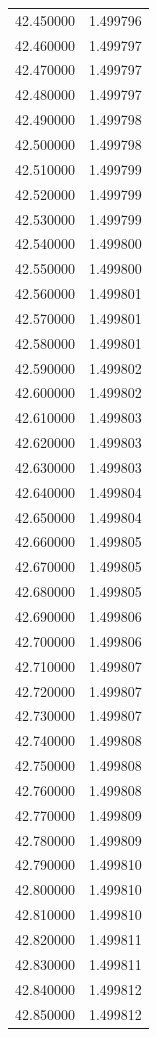 \begin{tabular}{rr}
42.450000 & 1.499796 \\
42.460000 & 1.499797 \\
42.470000 & 1.499797 \\
42.480000 & 1.499797 \\
42.490000 & 1.499798 \\
42.500000 & 1.499798 \\
42.510000 & 1.499799 \\
42.520000 & 1.499799 \\
42.530000 & 1.499799 \\
42.540000 & 1.499800 \\
42.550000 & 1.499800 \\
42.560000 & 1.499801 \\
42.570000 & 1.499801 \\
42.580000 & 1.499801 \\
42.590000 & 1.499802 \\
42.600000 & 1.499802 \\
42.610000 & 1.499803 \\
42.620000 & 1.499803 \\
42.630000 & 1.499803 \\
42.640000 & 1.499804 \\
42.650000 & 1.499804 \\
42.660000 & 1.499805 \\
42.670000 & 1.499805 \\
42.680000 & 1.499805 \\
42.690000 & 1.499806 \\
42.700000 & 1.499806 \\
42.710000 & 1.499807 \\
42.720000 & 1.499807 \\
42.730000 & 1.499807 \\
42.740000 & 1.499808 \\
42.750000 & 1.499808 \\
42.760000 & 1.499808 \\
42.770000 & 1.499809 \\
42.780000 & 1.499809 \\
42.790000 & 1.499810 \\
42.800000 & 1.499810 \\
42.810000 & 1.499810 \\
42.820000 & 1.499811 \\
42.830000 & 1.499811 \\
42.840000 & 1.499812 \\
42.850000 & 1.499812 \\

\end{tabular}
